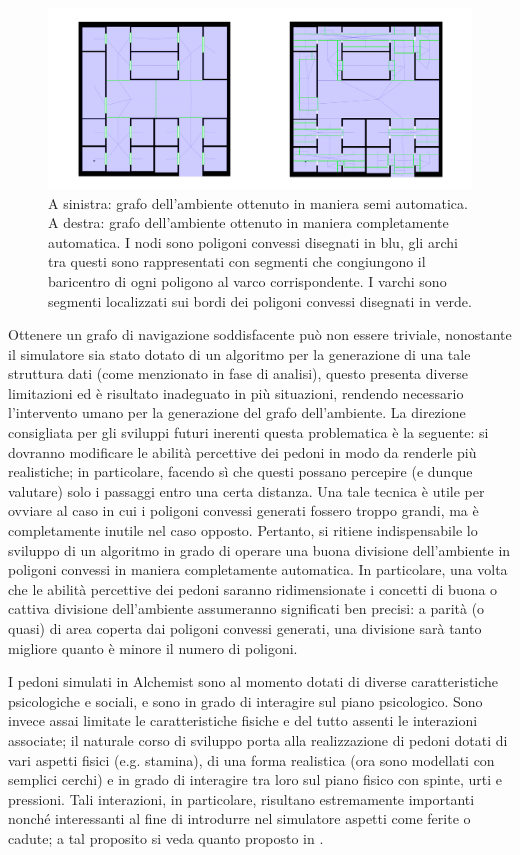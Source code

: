 \documentclass[12pt,a4paper,openright,oneside]{book}
\begin{document}
\begin{figure}
	\centering
	\includegraphics[width=\linewidth]{figures/envgraph.png}
	\caption{A sinistra: grafo dell'ambiente ottenuto in maniera semi automatica. A destra: grafo dell'ambiente ottenuto in maniera completamente automatica. I nodi sono poligoni convessi disegnati in blu, gli archi tra questi sono rappresentati con segmenti che congiungono il baricentro di ogni poligono al varco corrispondente. I varchi sono segmenti localizzati sui bordi dei poligoni convessi disegnati in verde.}
	\label{fig:envgraphs}
\end{figure}
\newline
Ottenere un grafo di navigazione soddisfacente può non essere triviale, nonostante il simulatore sia stato dotato di un algoritmo per la generazione di una tale struttura dati (come menzionato in fase di analisi), questo presenta diverse limitazioni ed è risultato inadeguato in più situazioni, rendendo necessario l'intervento umano per la generazione del grafo dell'ambiente. La direzione consigliata per gli sviluppi futuri inerenti questa problematica è la seguente: si dovranno modificare le abilità percettive dei pedoni in modo da renderle più realistiche; in particolare, facendo sì che questi possano percepire (e dunque valutare) solo i passaggi entro una certa distanza. Una tale tecnica è utile per ovviare al caso in cui i poligoni convessi generati fossero troppo grandi, ma è completamente inutile nel caso opposto. Pertanto, si ritiene indispensabile lo sviluppo di un algoritmo in grado di operare una buona divisione dell'ambiente in poligoni convessi in maniera completamente automatica. In particolare, una volta che le abilità percettive dei pedoni saranno ridimensionate i concetti di buona o cattiva divisione dell'ambiente assumeranno significati ben precisi: a parità (o quasi) di area coperta dai poligoni convessi generati, una divisione sarà tanto migliore quanto è minore il numero di poligoni.

I pedoni simulati in Alchemist sono al momento dotati di diverse caratteristiche psicologiche e sociali, e sono in grado di interagire sul piano psicologico. Sono invece assai limitate le caratteristiche fisiche e del tutto assenti le interazioni associate; il naturale corso di sviluppo porta alla realizzazione di pedoni dotati di vari aspetti fisici (e.g. stamina), di una forma realistica (ora sono modellati con semplici cerchi) e in grado di interagire tra loro sul piano fisico con spinte, urti e pressioni. Tali interazioni, in particolare, risultano estremamente importanti nonché interessanti al fine di introdurre nel simulatore aspetti come ferite o cadute; a tal proposito si veda quanto proposto in \cite{Pelechano2007}.
\end{document}

